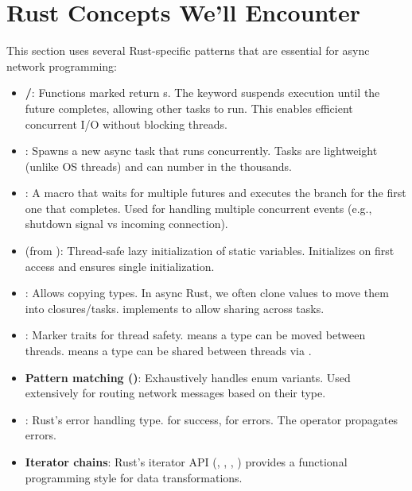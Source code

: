 \section{Rust Concepts We'll Encounter}
\label{sec:ch09-8-rust-concepts}

This section uses several Rust-specific patterns that are essential for async network programming:

\begin{itemize}
  \item \textbf{/}: Functions marked  return s. The  keyword suspends execution until the future completes, allowing other tasks to run. This enables efficient concurrent I/O without blocking threads.

  \item \textbf{}: Spawns a new async task that runs concurrently. Tasks are lightweight (unlike OS threads) and can number in the thousands.

  \item \textbf{}: A macro that waits for multiple futures and executes the branch for the first one that completes. Used for handling multiple concurrent events (e.g., shutdown signal vs incoming connection).

  \item \textbf{} (from ): Thread-safe lazy initialization of static variables. Initializes on first access and ensures single initialization.

  \item \textbf{}: Allows copying types. In async Rust, we often clone values to move them into closures/tasks.  implements  to allow sharing across tasks.

  \item \textbf{}: Marker traits for thread safety.  means a type can be moved between threads.  means a type can be shared between threads via .

  \item \textbf{Pattern matching ()}: Exhaustively handles enum variants. Used extensively for routing network messages based on their type.

  \item \textbf{}: Rust's error handling type.  for success,  for errors. The  operator propagates errors.

  \item \textbf{Iterator chains}: Rust's iterator API (, , , ) provides a functional programming style for data transformations.
\end{itemize}

